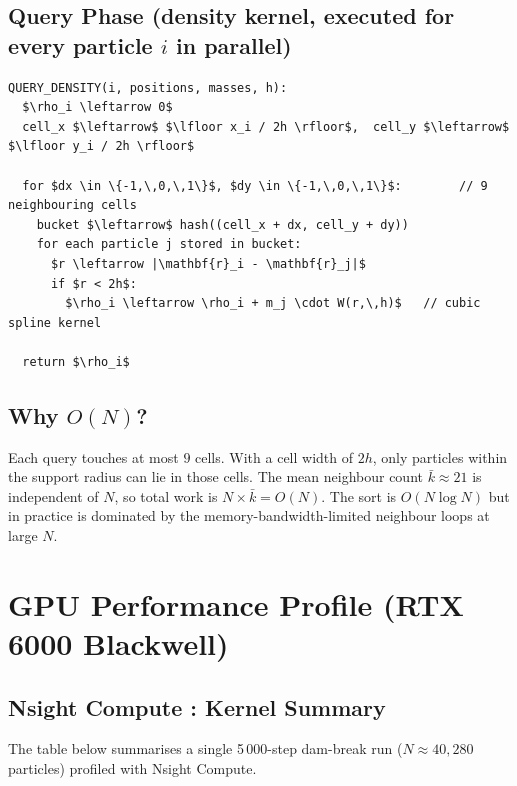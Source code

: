 \documentclass[11pt,a4paper]{article}
\begin{document}
\subsection{Query Phase (density kernel, executed for every particle $i$ in parallel)}

\begin{lstlisting}
QUERY_DENSITY(i, positions, masses, h):
  $\rho_i \leftarrow 0$
  cell_x $\leftarrow$ $\lfloor x_i / 2h \rfloor$,  cell_y $\leftarrow$ $\lfloor y_i / 2h \rfloor$

  for $dx \in \{-1,\,0,\,1\}$, $dy \in \{-1,\,0,\,1\}$:        // 9 neighbouring cells
    bucket $\leftarrow$ hash((cell_x + dx, cell_y + dy))
    for each particle j stored in bucket:
      $r \leftarrow |\mathbf{r}_i - \mathbf{r}_j|$
      if $r < 2h$:
        $\rho_i \leftarrow \rho_i + m_j \cdot W(r,\,h)$   // cubic spline kernel

  return $\rho_i$
\end{lstlisting}

\subsection{Why $O(N)$?}

Each query touches at most $9$ cells.  With a cell width of $2h$, only particles within the
support radius can lie in those cells.  The mean neighbour count $\bar{k} \approx 21$ is
independent of $N$, so total work is $N \times \bar{k} = O(N)$.  The sort is $O(N\log N)$
but in practice is dominated by the memory-bandwidth-limited neighbour loops at large $N$.

\section{GPU Performance Profile (RTX 6000 Blackwell)}

\subsection{Nsight Compute : Kernel Summary}

The table below summarises a single 5\,000-step dam-break run
($N \approx 40{,}280$ particles) profiled with Nsight Compute.
\end{document}

